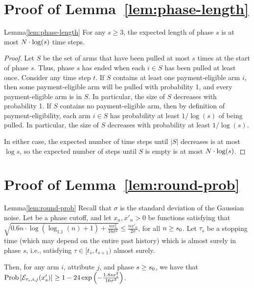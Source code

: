 \section{Proof of Lemma~\ref{lem:phase-length}}
\label{sec:lemma4-proof}

\begin{rlemma}{Lemma}{\ref{lem:phase-length}}
For any $s\geq 3$, the expected length of phase $s$ is at most
$N \cdot \log(s)$ time steps.
\end{rlemma}

\begin{proof}
Let $S$ be the set of arms that have been pulled at most
$s$ times at the start of phase $s$.
Thus, phase $s$ has ended when each $i \in S$ has been pulled at least once.
Consider any time step $t$.
If $S$ contains at least one payment-eligible arm $i$,
then some payment-eligible arm will be pulled with probability 1,
and every payment-eligible arm is in $S$.
In particular, the size of $S$ decreases with probability 1.
If $S$ contains no payment-eligible arm,
then by definition of payment-eligibility,
each arm $i \in S$ has probability at least $1/\log(s)$ of being pulled.
In particular, the size of $S$ decreases with probability at least $1/\log(s)$.

In either case, the expected number of time steps until
$|S|$ decreases is at most $\log s$,
so the expected number of steps until $S$ is empty is at most
$N \cdot \log(s)$.
\end{proof}







\section{Proof of Lemma~\ref{lem:round-prob}}
\label{sec:lemma5-proof}

\begin{rlemma}{Lemma}{\ref{lem:round-prob}}
Recall that $\sigma$ is the standard deviation of the Gaussian noise.
Let \LatePhase be a phase cutoff, 
and let $x_n, x'_n > 0$ be functions satisfying that
$\sqrt{0.6 n \cdot \log (\log_{1.1}(n) + 1) + \frac{n x_n^2}{16 \sigma^2}}
\leq \frac{n x'_n}{2 \sigma}$,
for all $n \geq s_0$.
Let $\tau_s$ be a stopping time
(which may depend on the entire past history)
which is almost surely in phase $s$,
i.e., satisfying $\tau \in [t_s, t_{s+1})$ almost surely.

Then, for any arm $i$, attribute $j$, and phase $s \geq s_0$,
we have that
$\Prob{\AccE{\tau_s}{i}{j}{x'_s}}
\geq 1 - 24 \exp\left(-\frac{1.8 s x_s^2}{16 \sigma^2} \right)$.
\end{rlemma}

